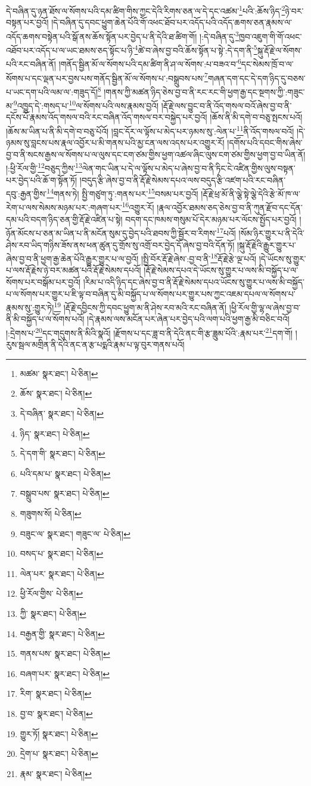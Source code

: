 དེ་བཞིན་དུ་ཉན་ཐོས་ལ་སོགས་པའི་དམ་ཚིག་གིས་ཀྱང་དེའི་རིགས་ཅན་ལ་དེ་དང་འཚམ་\footnote{མཚམ་  སྣར་ཐང་།  པེ་ཅིན། }པའི་:ཆོས་ཉིད་\footnote{ཆོས་  སྣར་ཐང་།  པེ་ཅིན། }ཉེ་བར་བསྟན་པར་བྱའོ། །དེ་བཞིན་དུ་དབང་ཕྱུག་ཆེན་པོའི་གོ་འཕང་ཐོབ་པར་འདོད་པའི་འདོད་ཆགས་ཅན་རྣམས་ལ་འདོད་ཆགས་བསྟེན་པའི་སྒོ་ནས་ཆོས་སྟོན་པར་བྱེད་པ་ནི་དེའི་ཐ་ཚིག་གོ། །:དེ་བཞིན་དུ་\footnote{དེ་བཞིན་  སྣར་ཐང་།  པེ་ཅིན། }ཁྱབ་འཇུག་གི་གོ་འཕང་འཐོབ་པར་འདོད་པ་ལ་ཡང་ཐམས་ཅད་སྟོང་པ་ཉི་\footnote{ཉིད་  སྣར་ཐང་།  པེ་ཅིན། }ཚེ་བ་ཞེས་བྱ་བའི་ཆོས་སྟོན་པ་སྟེ་:དེ་དག་ནི་\footnote{དེ་དག་གི་  སྣར་ཐང་།  པེ་ཅིན། }སྐུ་རྡོ་རྗེ་ལ་སོགས་པའི་རང་བཞིན་ནོ། །གནོད་སྦྱིན་མོ་ལ་སོགས་པའི་དམ་ཚིག་ནི་ཤ་ལ་སོགས་:པ་བཟའ་བ་\footnote{པའི་དམ་པ་  སྣར་ཐང་།  པེ་ཅིན། }དང་སེམས་ཁྲོ་བ་ལ་སོགས་པ་དང་ལྡན་པར་བྱས་པས་གནོད་སྦྱིན་མོ་ལ་སོགས་པ་:བསྒྲུབས་པས་\footnote{བསྒྲུབ་པས་  སྣར་ཐང་།  པེ་ཅིན། }གཞན་དག་དང་དེ་དག་ཉིད་དུ་བཅས་པ་ཡང་དག་པའི་ལམ་ལ་:གཟུད་དོ།\footnote{གཟུགས་སོ།  པེ་ཅིན། } །གནས་ཀྱི་མཚན་ཉིད་ཅེས་བྱ་བ་ནི་རང་རང་གི་ཕྱག་རྒྱ་དང་སྔགས་ཀྱི་:གཟུང་མ་\footnote{བཟུང་ལ་  སྣར་ཐང་། གཟུང་ལ་  པེ་ཅིན། }འཁྱུད་དེ་:གསད་པ་\footnote{བསད་པ་  སྣར་ཐང་།  པེ་ཅིན། }ལ་སོགས་པའི་ལས་རྣམས་བྱའོ། །རྡོ་རྗེ་ལས་བྱུང་བ་ནི་འོད་གསལ་བའོ་ཞེས་བྱ་བ་ནི་དངོས་པོ་རྣམས་འོད་གསལ་བའི་རང་བཞིན་འོད་གསལ་བར་བསྐྱེད་པར་བྱའོ། །ཆོས་ནི་མི་དགེ་བ་བཅུ་སྤངས་པའོ། །ཆོས་མ་ཡིན་པ་ནི་མི་དགེ་བ་བཅུ་པོའོ། །བླང་དོར་ལ་ལྟོས་པ་མེད་པར་ཉམས་སུ་:ལེན་པ་\footnote{ལེན་པར་  སྣར་ཐང་།  པེ་ཅིན། }ནི་འོད་གསལ་བའོ། །དེ་ཉམས་སུ་བླངས་པས་རྣལ་འབྱོར་པ་མི་གནས་པའི་མྱ་ངན་ལས་འདས་པར་འགྱུར་རོ། །དགོས་པའི་དབང་གིས་ཞེས་བྱ་བ་ནི་སངས་རྒྱས་ལ་སོགས་པ་ལ་ལུས་དང་ངག་ཙམ་གྱིས་ཕྱག་འཚལ་ཞིང་ལུས་ངག་ཙམ་གྱིས་ཕྱག་བྱ་བ་ཡིན་ནོ། །:ཕྱི་རོལ་གྱི་\footnote{ཕྱི་རོལ་གྱིས་  པེ་ཅིན། }བཅུད་ཀྱིས་\footnote{ཀྱི་  སྣར་ཐང་།  པེ་ཅིན། }ལེན་གང་ཡིན་པ་དེ་ལ་ལྟོས་པ་མེད་པ་ཞེས་བྱ་བ་ནི་ཏིང་ངེ་འཛིན་གྱིས་ལུས་བསྟན་པར་བྱེད་པའི་ཆོ་ག་སྟོན་ཏོ། །བདུད་རྩི་ཞེས་བྱ་བ་ནི་རྡོ་རྗེ་སེམས་དཔའ་ལས་བདུད་རྩི་འཛག་པའི་རང་བཞིན་དབུ་:རྒྱན་གྱིས་\footnote{བརྒྱན་གྱི་  སྣར་ཐང་།  པེ་ཅིན། }གནས་ཏེ། སྤྱི་གཙུག་ཏུ་:གནས་པར་\footnote{གནས་པས་  སྣར་ཐང་།  པེ་ཅིན། }བསམ་པར་བྱའོ། །རྡོ་རྗེ་ཕྲ་མོ་ནི་ལྕེ་སྟེ་ལྕེ་དེའི་རྩེ་མོ་ཁ་ལ་རེག་པ་ལས་སེམས་མཉམ་པར་:གཞག་པར་\footnote{བཞག་པར་  སྣར་ཐང་།  པེ་ཅིན། }འགྱུར་རོ། །རྣལ་འབྱོར་ཐམས་ཅད་ཅེས་བྱ་བ་ནི་ཀུན་རྫོབ་དང་དོན་དམ་པའི་བདག་ཉིད་ཅན་གྱི་རྡོ་རྗེ་འཛིན་པ་སྟེ། བདག་དང་ཁམས་གསུམ་པོ་དེར་མཉམ་པར་ལོངས་སྤྱོད་པར་བྱའོ། །ཉོན་མོངས་པ་ཅན་མ་ཡིན་པ་ནི་མངོན་སུམ་དུ་བྱེད་པའི་ཐབས་ཀྱི་སྦྱོར་བ་རིགས་\footnote{རིག་  སྣར་ཐང་།  པེ་ཅིན། }པའོ། །སོམ་ཉིར་གྱུར་པ་ནི་དེའི་ཤེས་རབ་ཡིད་གཉིས་ཟོས་ནས་ཕན་ཚུན་དུ་གྲོས་སུ་འགྲོ་བར་བྱེད་དོ་ཞེས་བྱ་བའི་དོན་ཏོ། །སྐུ་རྡོ་རྗེའི་རྒྱུར་གྱུར་པ་ཞེས་བྱ་བ་ནི་ཕྱག་རྒྱ་ཆེན་པོའི་རྒྱུར་གྱུར་པ་ལ་བྱའོ། །སྤྱི་བོར་རྡོ་རྗེ་ཞེས་:བྱ་བ་ནི་\footnote{བྱ་བ་  སྣར་ཐང་།  པེ་ཅིན། }རྡོ་རྗེ་རྩེ་ལྔ་པའོ། །དེ་ཡོངས་སུ་གྱུར་པ་ལས་རྡོ་རྗེས་ཉེ་བར་མཚན་པའི་རྡོ་རྗེ་སེམས་དཔའོ། །རྡོ་རྗེ་སེམས་དཔའ་དེ་ཡོངས་སུ་གྱུར་པ་ལས་མི་བསྐྱོད་པ་ལ་སོགས་པར་བསྒོམ་པར་བྱའོ། །རིམ་པ་འདི་ཉིད་དང་ཞེས་བྱ་བ་ནི་རྡོ་རྗེ་སེམས་དཔའ་ཡོངས་སུ་གྱུར་པ་ལས་མི་བསྐྱོད་པ་ལ་སོགས་པར་གྱུར་པ་ཇི་ལྟ་བ་བཞིན་དུ་མི་བསྐྱོད་པ་ལ་སོགས་པར་གྱུར་པས་ཀྱང་འཇམ་དཔལ་ལ་སོགས་པ་རྣམས་སུ་:གྱུར་ཏེ།\footnote{གྱུར་ཏོ།  སྣར་ཐང་།  པེ་ཅིན། } །རྡོ་རྗེ་དབྱིངས་ཀྱི་དབང་ཕྱུག་མ་ནི་ཤེས་རབ་མའི་རང་བཞིན་ནོ། །ཕྱི་རོལ་གྱི་ལྷ་ལ་ཞེས་བྱ་བ་ནི་མི་བསྐྱོད་པ་ལ་སོགས་པའོ། །དེ་རྣམས་ལས་མངོན་པར་ཞེན་པར་བྱེད་པའི་ལག་པའི་ཕྱག་རྒྱ་མི་བཅིང་བའོ། །:དྲེགས་པ་\footnote{དྲེག་པ་  སྣར་ཐང་།  པེ་ཅིན། }དང་གདུགས་ནི་མིའི་སྣའོ། །རྫོགས་པ་དང་ཟླ་བ་ནི་དེའི་ནང་གི་རྩ་ཟླུམ་པོའི་:རྣམ་པར་\footnote{རྣམ་  སྣར་ཐང་།  པེ་ཅིན། }དག་གོ། །རུས་སྦལ་མགྲིན་ནི་དེའི་ནང་ན་རྩ་པདྨའི་རྣམ་པ་ལྟ་བུར་གནས་པའོ། 